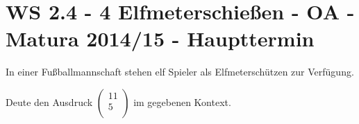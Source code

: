 \section{WS 2.4 - 4 Elfmeterschießen - OA - Matura 2014/15 - Haupttermin}

\begin{beispiel}[WS 2.4]{1} %
In einer Fußballmannschaft stehen elf Spieler als Elfmeterschützen zur Verfügung. \leer

Deute den Ausdruck $\begin{pmatrix}
	11 \\ 5 \\
\end{pmatrix}$ im gegebenen Kontext. 

\end{beispiel}
